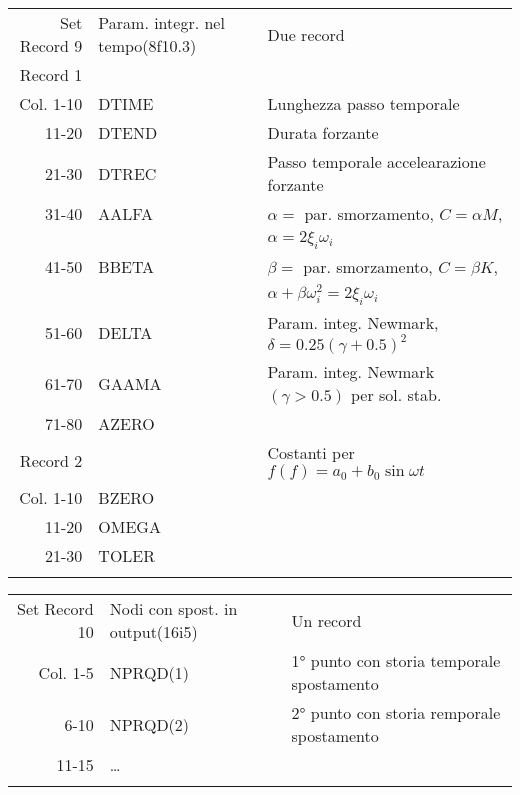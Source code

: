 \begin{tabular}{rll}
	Set Record 9 & Param. integr. nel tempo(8f10.3)& Due record                                       \\
	Record 1     &                                &                                                   \\
	Col. 1-10    & DTIME                          & Lunghezza passo temporale                         \\
	11-20    & DTEND                          & Durata forzante                                   \\
	21-30    & DTREC                          & Passo temporale accelearazione forzante           \\
	31-40    & AALFA                          & $\alpha=$ par. smorzamento, $C=\alpha M$,         \\
	&                                & $\alpha=2\xi_i\omega_i$\\
	41-50    & BBETA                          & $\beta =$ par. smorzamento, $C=\beta K$,          \\
	&                                & $\alpha+\beta\omega_i^2=2\xi_i\omega_i$           \\
	51-60    & DELTA                          & Param. integ. Newmark, $\delta=0.25(\gamma+0.5)^2$\\
	61-70    & GAAMA                          & Param. integ. Newmark $(\gamma>0.5)$ per sol. stab.\\
	71-80    & AZERO                          &                                                   \\
	Record 2     &                                & Costanti per $f(f)=a_0+b_0\sin{\omega t}$         \\
	Col. 1-10    & BZERO                          &                                                   \\
	11-20    & OMEGA                          &                                                   \\
	21-30    & TOLER                          &                                                   \\
	&                                &                                                   \\
\end{tabular}

\begin{tabular}{rll}
	Set Record 10& Nodi con spost. in output(16i5)& Un record                                         \\
	Col.  1-5    & NPRQD(1)                       & 1° punto con storia temporale spostamento         \\
	6-10         & NPRQD(2)                       & 2° punto con storia remporale spostamento         \\
	11-15        & \dots                          &                                                   \\
	&                                             &                                                   \\
\end{tabular}

